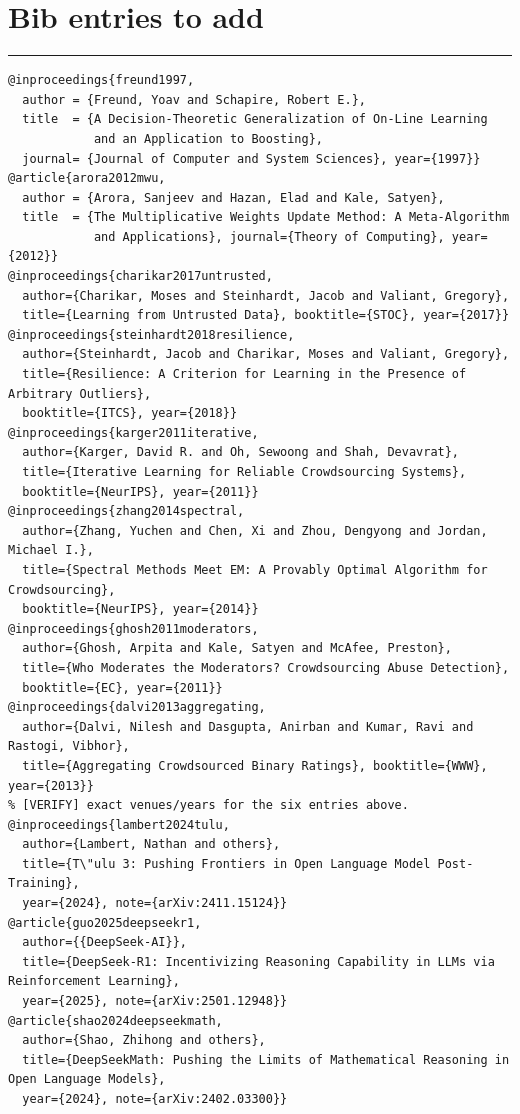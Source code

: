 \documentclass[11pt]{article}
\theoremstyle{definition}
\theoremstyle{remark}
\begin{document}
\section*{Bib entries to add}
\hrule
\begin{verbatim}
@inproceedings{freund1997,
  author = {Freund, Yoav and Schapire, Robert E.},
  title  = {A Decision-Theoretic Generalization of On-Line Learning
            and an Application to Boosting},
  journal= {Journal of Computer and System Sciences}, year={1997}}
@article{arora2012mwu,
  author = {Arora, Sanjeev and Hazan, Elad and Kale, Satyen},
  title  = {The Multiplicative Weights Update Method: A Meta-Algorithm
            and Applications}, journal={Theory of Computing}, year={2012}}
@inproceedings{charikar2017untrusted,
  author={Charikar, Moses and Steinhardt, Jacob and Valiant, Gregory},
  title={Learning from Untrusted Data}, booktitle={STOC}, year={2017}}
@inproceedings{steinhardt2018resilience,
  author={Steinhardt, Jacob and Charikar, Moses and Valiant, Gregory},
  title={Resilience: A Criterion for Learning in the Presence of Arbitrary Outliers},
  booktitle={ITCS}, year={2018}}
@inproceedings{karger2011iterative,
  author={Karger, David R. and Oh, Sewoong and Shah, Devavrat},
  title={Iterative Learning for Reliable Crowdsourcing Systems},
  booktitle={NeurIPS}, year={2011}}
@inproceedings{zhang2014spectral,
  author={Zhang, Yuchen and Chen, Xi and Zhou, Dengyong and Jordan, Michael I.},
  title={Spectral Methods Meet EM: A Provably Optimal Algorithm for Crowdsourcing},
  booktitle={NeurIPS}, year={2014}}
@inproceedings{ghosh2011moderators,
  author={Ghosh, Arpita and Kale, Satyen and McAfee, Preston},
  title={Who Moderates the Moderators? Crowdsourcing Abuse Detection},
  booktitle={EC}, year={2011}}
@inproceedings{dalvi2013aggregating,
  author={Dalvi, Nilesh and Dasgupta, Anirban and Kumar, Ravi and Rastogi, Vibhor},
  title={Aggregating Crowdsourced Binary Ratings}, booktitle={WWW}, year={2013}}
% [VERIFY] exact venues/years for the six entries above.
@inproceedings{lambert2024tulu,
  author={Lambert, Nathan and others},
  title={T\"ulu 3: Pushing Frontiers in Open Language Model Post-Training},
  year={2024}, note={arXiv:2411.15124}}
@article{guo2025deepseekr1,
  author={{DeepSeek-AI}},
  title={DeepSeek-R1: Incentivizing Reasoning Capability in LLMs via Reinforcement Learning},
  year={2025}, note={arXiv:2501.12948}}
@article{shao2024deepseekmath,
  author={Shao, Zhihong and others},
  title={DeepSeekMath: Pushing the Limits of Mathematical Reasoning in Open Language Models},
  year={2024}, note={arXiv:2402.03300}}

\end{verbatim}
\end{document}
